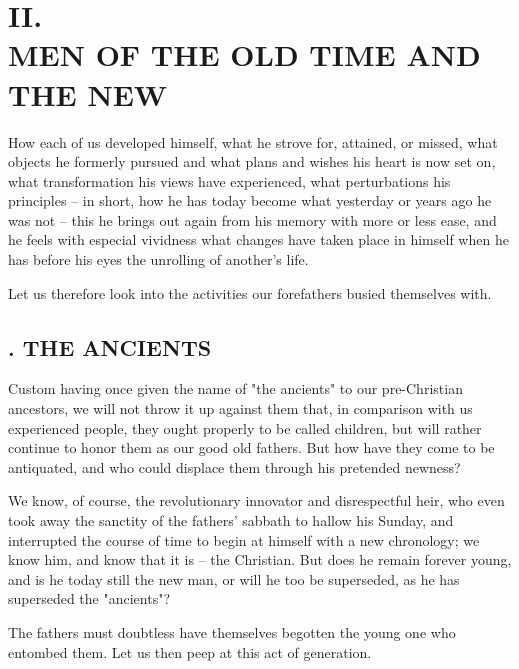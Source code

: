 \chapter[II. Men Of The Old And The New]{\centering II.\\
MEN OF THE OLD TIME AND THE NEW}

\medskip{}

\noindent{}How each of us developed himself, what he strove for, attained, or 
missed, what objects he formerly pursued and what plans and wishes his heart 
is now set on, what transformation his views have experienced, what 
perturbations his principles -- in short, how he has today become what 
yesterday or years ago he was not -- this he brings out again from his memory 
with more or less ease, and he feels with especial vividness what changes have 
taken place in himself when he has before his eyes the unrolling of another's 
life.

Let us therefore look into the activities our forefathers busied themselves 
with.

\medskip{}

\section[1. The Ancients]{. THE ANCIENTS}

Custom having once given the name of "{}the ancients"{} to our pre-Christian 
ancestors, we will not throw it up against them that, in comparison with us 
experienced people, they ought properly to be called children, but will rather 
continue to honor them as our good old fathers. But how have they come to be 
antiquated, and who could displace them through his pretended newness?

We know, of course, the revolutionary innovator and disrespectful heir, who 
even took away the sanctity of the fathers' sabbath to hallow his Sunday, and 
interrupted the course of time to begin at himself with a new chronology; we 
know him, and know that it is -- the Christian. But does he remain forever 
young, and is he today still the new man, or will he too be superseded, as he 
has superseded the "{}ancients"{}?

The fathers must doubtless have themselves begotten the young one who entombed 
them. Let us then peep at this act of generation.

